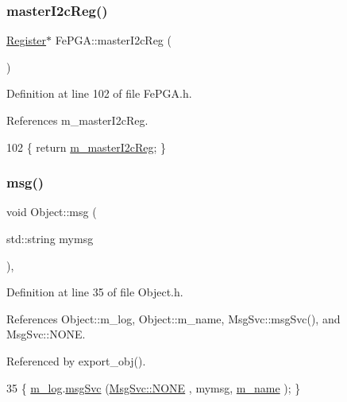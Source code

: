 \subsubsection{\texorpdfstring{master\+I2c\+Reg()}{masterI2cReg()}}
{\footnotesize\ttfamily \hyperlink{classRegister}{Register}$\ast$ Fe\+P\+G\+A\+::master\+I2c\+Reg (\begin{DoxyParamCaption}{ }\end{DoxyParamCaption})\hspace{0.3cm}{\ttfamily [inline]}}



Definition at line 102 of file Fe\+P\+G\+A.\+h.



References m\+\_\+master\+I2c\+Reg.


\begin{DoxyCode}
102 \{ \textcolor{keywordflow}{return} \hyperlink{classFePGA_adb390ea8de4a6cbce648dc62e4405f32}{m\_masterI2cReg}; \}
\end{DoxyCode}
\mbox{\label{classObject_a58b2d0618c2d08cf2383012611528d97}} 
\subsubsection{\texorpdfstring{msg()}{msg()}\hspace{0.1cm}{\footnotesize\ttfamily [1/2]}}
{\footnotesize\ttfamily void Object\+::msg (\begin{DoxyParamCaption}\item[{std\+::string}]{mymsg }\end{DoxyParamCaption})\hspace{0.3cm}{\ttfamily [inline]}, {\ttfamily [inherited]}}



Definition at line 35 of file Object.\+h.



References Object\+::m\+\_\+log, Object\+::m\+\_\+name, Msg\+Svc\+::msg\+Svc(), and Msg\+Svc\+::\+N\+O\+NE.



Referenced by export\+\_\+obj().


\begin{DoxyCode}
35 \{ \hyperlink{classObject_a0d269813dd7ac1f24bc143031e2963f2}{m\_log}.\hyperlink{classMsgSvc_ad25f18047920cc59a314e5098259711c}{msgSvc} (\hyperlink{classMsgSvc_ae671eb7301996cd049d2da8a65925926a9be9ae32fed8e1e6eba4a58692210fbd}{MsgSvc::NONE}    , mymsg, \hyperlink{classObject_a8b83c95c705d2c3ba0d081fe1710f48d}{m\_name} ); \}
\end{DoxyCode}
\mbox{\label{classObject_ac5d59299273cee27aacf7de00d2e7034}} 
